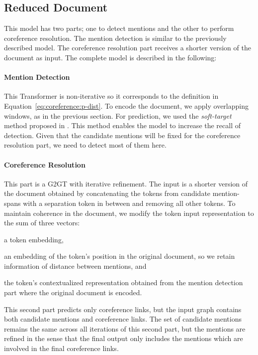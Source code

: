 \documentclass[11pt]{article}
\begin{document}
\subsection{Reduced Document}
This model has two parts; one to detect mentions and the other to perform coreference resolution. The mention detection is similar to the previously described model. The coreference resolution part receives a shorter version of the document as input. The complete model is described in the following:
\paragraph{Mention Detection} This Transformer is non-iterative so it corresponds to the definition in Equation~\eqref{eq:coreference:p-dist}. To encode the document, we apply overlapping windows, as in the previous section. For prediction, we used the \emph{soft-target} method proposed in \cite{miculicich-henderson-2020-partially}. This method enables the model to increase the recall of detection. 
	Given that the candidate mentions will be fixed for the coreference resolution part, we need to detect most of them here. 
\paragraph{Coreference Resolution} This part is a G2GT with iterative refinement. The input is a shorter version of the document obtained by concatenating the tokens from candidate mention-spans with a separation token in between and removing all other tokens. To maintain coherence in the document, we modify the token input representation to the sum of three vectors:
	\begin{enumerate*}[(\alph*)]
		\item a token embedding,
		\item an embedding of the token's position in the original document, so we retain information of distance between mentions, and
		\item the token's contextualized representation obtained from the mention detection part where the original document is encoded.
	\end{enumerate*}
This second part predicts only coreference links, but the input graph contains both candidate mentions and coreference links.  The set of candidate mentions remains the same across all iterations of this second part, but the mentions are refined in the sense that the final output only includes the mentions which are involved in the final coreference links.
\end{document}
